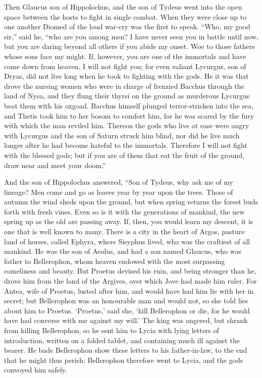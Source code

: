 Then Glaucus son of Hippolochus, and the son of Tydeus went into the open
space between the hosts to fight in single combat. When they were close up
to one another Diomed of the loud war-cry was the first to speak. “Who, my
good sir,” said he, “who are you among men? I have never seen you in
battle until now, but you are daring beyond all others if you abide my
onset. Woe to those fathers whose sons face my might. If, however, you are
one of the immortals and have come down from heaven, I will not fight you;
for even valiant Lycurgus, son of Dryas, did not live long when he took to
fighting with the gods. He it was that drove the nursing women who were in
charge of frenzied Bacchus through the land of Nysa, and they flung their
thyrsi on the ground as murderous Lycurgus beat them with his oxgoad.
Bacchus himself plunged terror-stricken into the sea, and Thetis took him
to her bosom to comfort him, for he was scared by the fury with which the
man reviled him. Thereon the gods who live at ease were angry with
Lycurgus and the son of Saturn struck him blind, nor did he live much
longer after he had become hateful to the immortals. Therefore I will not
fight with the blessed gods; but if you are of them that eat the fruit of
the ground, draw near and meet your doom.”

And the son of Hippolochus answered, “Son of Tydeus, why ask me of my
lineage? Men come and go as leaves year by year upon the trees. Those of
autumn the wind sheds upon the ground, but when spring returns the forest
buds forth with fresh vines. Even so is it with the generations of
mankind, the new spring up as the old are passing away. If, then, you
would learn my descent, it is one that is well known to many. There is a
city in the heart of Argos, pasture land of horses, called Ephyra, where
Sisyphus lived, who was the craftiest of all mankind. He was the son of
Aeolus, and had a son named Glaucus, who was father to Bellerophon, whom
heaven endowed with the most surpassing comeliness and beauty. But Proetus
devised his ruin, and being stronger than he, drove him from the land of
the Argives, over which Jove had made him ruler. For Antea, wife of
Proetus, lusted after him, and would have had him lie with her in secret;
but Bellerophon was an honourable man and would not, so she told lies
about him to Proetus. ‘Proetus,’ said she, ‘kill Bellerophon or die, for
he would have had converse with me against my will.’ The king was angered,
but shrank from killing Bellerophon, so he sent him to Lycia with lying
letters of introduction, written on a folded tablet, and containing much
ill against the bearer. He bade Bellerophon show these letters to his
father-in-law, to the end that he might thus perish; Bellerophon therefore
went to Lycia, and the gods convoyed him safely.

